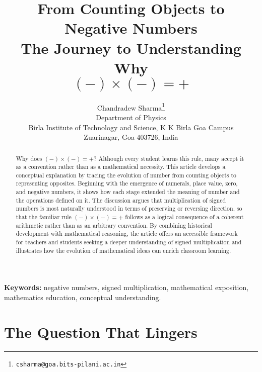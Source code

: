 \documentclass[11pt]{article}
\title{
\textcolor{mathblue}{\Huge From Counting Objects to Negative Numbers}\\[4mm]
\textcolor{journeygrayblue}{\Large
The Journey to Understanding Why
\[(-)\times(-)=+\]}}
\author{
Chandradew Sharma\thanks{ \texttt{csharma@goa.bits-pilani.ac.in}}\\
Department of Physics\\
Birla Institute of Technology and Science, K K Birla Goa Campus\\
Zuarinagar, Goa 403726, India
}
\date{}
\begin{document}
\maketitle


\begin{abstract}
Why does $(-)\times(-)=+$? Although every student learns this rule, many accept it as a convention rather than as a mathematical necessity. This article develops a conceptual explanation by tracing the evolution of number from counting objects to representing opposites. Beginning with the emergence of numerals, place value, zero, and negative numbers, it shows how each stage extended the meaning of number and the operations defined on it. The discussion argues that multiplication of signed numbers is most naturally understood in terms of preserving or reversing direction, so that the familiar rule $(-)\times(-)=+$ follows as a logical consequence of a coherent arithmetic rather than as an arbitrary convention. By combining historical development with mathematical reasoning, the article offers an accessible framework for teachers and students seeking a deeper understanding of signed multiplication and illustrates how the evolution of mathematical ideas can enrich classroom learning.
\end{abstract}

\noindent\textbf{Keywords:} negative numbers, signed multiplication, mathematical exposition,  mathematics education, conceptual understanding.

\section*{\textcolor{curiositycolor}{The Question That Lingers}}
\end{document}
